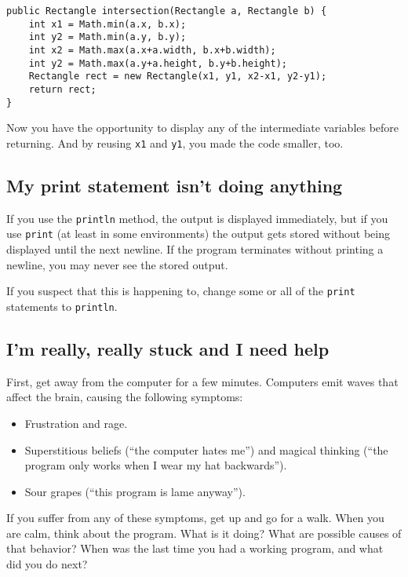 \documentclass[12pt]{book}
\theoremstyle{definition}
\begin{document}
\begin{lstlisting}
public Rectangle intersection(Rectangle a, Rectangle b) { 
    int x1 = Math.min(a.x, b.x);
    int y2 = Math.min(a.y, b.y);
    int x2 = Math.max(a.x+a.width, b.x+b.width);
    int y2 = Math.max(a.y+a.height, b.y+b.height);
    Rectangle rect = new Rectangle(x1, y1, x2-x1, y2-y1);
    return rect;
}
\end{lstlisting}
%
Now you have the opportunity to display any of
the intermediate variables before returning.  And by
reusing {\tt x1} and {\tt y1}, you made the code smaller, too.


\subsection*{My print statement isn't doing anything}

If you use the {\tt println} method, the output is displayed
immediately, but if you use {\tt print} (at least in some
environments) the output gets stored without being displayed until the
next newline.  If the program terminates without
printing a newline, you may never see the stored output.

If you suspect that this is happening to, change
some or all of the {\tt print} statements to {\tt println}.


\subsection*{I'm really, really stuck and I need help}

First, get away from the computer for a few minutes.
Computers emit waves that affect the brain, causing the following
symptoms:

\begin{itemize}

\item Frustration and rage.

\item Superstitious beliefs (``the computer hates me'') and
magical thinking (``the program only works when I wear my
hat backwards'').

\item Sour grapes (``this program is lame anyway'').

\end{itemize}

If you suffer from any of these symptoms, get
up and go for a walk.  When you are calm, think about the program.
What is it doing?  What are possible causes of that
behavior?  When was the last time you had a working program,
and what did you do next?
\end{document}
